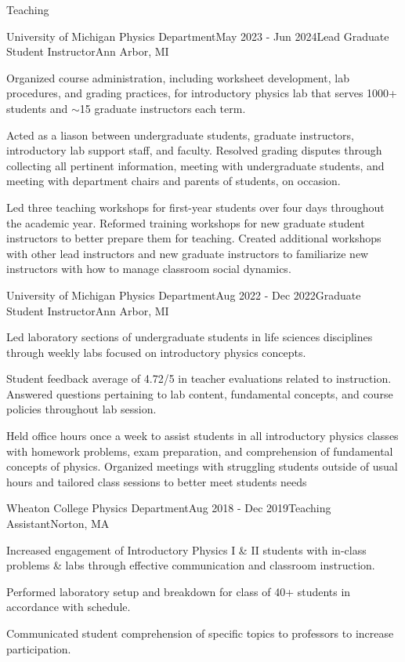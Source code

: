 \documentclass{resume} %
\begin{document}
\begin{rSection}{Teaching}

\begin{rSubsection}{University of Michigan Physics Department}{May 2023 - Jun 2024}{Lead Graduate Student Instructor}{Ann Arbor, MI}
    \item Organized course administration, including worksheet development, lab procedures, and grading practices, for introductory physics lab that serves 1000+ students and $\sim$15 graduate instructors each term.
    \item Acted as a liason between undergraduate students, graduate instructors, introductory lab support staff, and faculty. Resolved grading disputes through collecting all pertinent information, meeting with undergraduate students, and meeting with department chairs and parents of students, on occasion.
    \item Led three teaching workshops for first-year students over four days throughout the academic year. Reformed training workshops for new graduate student instructors to better prepare them for teaching. Created additional workshops with other lead instructors and new graduate instructors to familiarize new instructors with how to manage classroom social dynamics. 
\end{rSubsection}

\begin{rSubsection}{University of Michigan Physics Department}{Aug 2022 - Dec 2022}{Graduate Student Instructor}{Ann Arbor, MI}
    \item Led laboratory sections of undergraduate students in life sciences disciplines through weekly labs focused on introductory physics concepts. 
    \item Student feedback average of 4.72/5 in teacher evaluations related to instruction. Answered questions pertaining to lab content, fundamental concepts, and course policies throughout lab session.
    \item Held office hours once a week to assist students in all introductory physics classes with homework problems, exam preparation, and comprehension of fundamental concepts of physics. Organized meetings with struggling students outside of usual hours and tailored class sessions to better meet students needs

\end{rSubsection}
\newpage 
\begin{rSubsection}{Wheaton College Physics Department}{Aug 2018 - Dec 2019}{Teaching Assistant}{Norton, MA}
    \item Increased engagement of Introductory Physics I \& II students with in-class problems \& labs through effective communication and classroom instruction.
    \item Performed laboratory setup and breakdown for class of 40+ students in accordance with schedule.
    \item Communicated student comprehension of specific topics to professors to increase participation.


\end{rSubsection}
\end{rSection}
\end{document}
